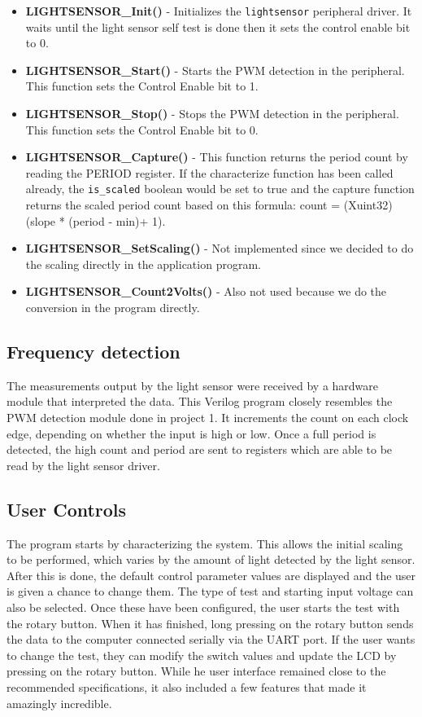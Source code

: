 \documentclass[11pt]{article}
\begin{document}
\begin{itemize}
\item \textbf{LIGHTSENSOR\_Init()} - Initializes the \texttt{lightsensor} peripheral driver. It waits until the light sensor self test is done then it sets the control enable bit to 0.
\item \textbf{LIGHTSENSOR\_Start()} - Starts the PWM detection in the peripheral. This function sets the Control Enable bit to 1.
\item \textbf{LIGHTSENSOR\_Stop()} - Stops the PWM detection in the peripheral. This function sets the Control Enable bit to 0.
\item \textbf{LIGHTSENSOR\_Capture()} - This function returns the period count by reading the PERIOD register. If the characterize function has been called already, the \texttt{is\_scaled} boolean would be set to true and the capture function returns the scaled period count based on this formula: count = (Xuint32)(slope * (period - min)+ 1).
\item \textbf{LIGHTSENSOR\_SetScaling() } - Not implemented since we decided to do the scaling directly in the application program.
\item \textbf{LIGHTSENSOR\_Count2Volts()} - Also not used because we do the conversion in the program directly.
\end{itemize}

%  

\subsection{Frequency detection}
The measurements output by the light sensor were received by a hardware module that interpreted the data.  This Verilog program closely resembles the PWM detection module done in project 1.  It increments the count on each clock edge, depending on whether the input is high or low.  Once a full period is detected, the high count and period are sent to registers which are able to be read by the light sensor driver.  

\subsection{User Controls} 
The program starts by characterizing the system.  This allows the initial scaling to be performed, which varies by the amount of light detected by the light sensor. After this is done, the default control parameter values are displayed and the user is given a chance to change them.  The type of test and starting input voltage can also be selected.  Once these have been configured, the user starts the test with the rotary button.  When it has finished, long pressing on the rotary button sends the data to the computer connected serially via the UART port.  If the user wants to change the test, they can modify the switch values and update the LCD by pressing on the rotary button.  While he user interface remained close to the recommended specifications, it also included a few features that made it amazingly incredible.
 
\end{document}
